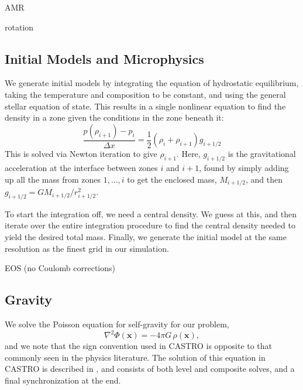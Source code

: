 \documentclass[12pt,preprint]{aastex}
\begin{document}
AMR

rotation


\subsection{Initial Models and Microphysics}


We generate initial models by integrating the equation of hydrostatic
equilibrium, taking the temperature and composition to be constant,
and using the general stellar equation of state.  This results in
a single nonlinear equation to find the density in a zone given the
conditions in the zone beneath it:
\begin{equation}
\frac{p(\rho_{i+1}) - p_i}{\Delta x} = \frac{1}{2} (\rho_i + \rho_{i+1}) g_{i+1/2}
\end{equation}
This is solved via Newton iteration to give $\rho_{i+1}$.  Here, $g_{i+1/2}$
is the gravitational acceleration at the interface between zones $i$ and $i+1$,
found by simply adding up all the mass from zones $1, \ldots, i$ to get the
enclosed mass, $M_{i+1/2}$, and then $g_{i+1/2} = GM_{i+1/2}/r_{i+1/2}^2$.

To start the integration off, we need a central density.  We guess at
this, and then iterate over the entire integration procedure to find
the central density needed to yield the desired total mass.  Finally,
we generate the initial model at the same resolution as the finest
grid in our simulation.

EOS (no Coulomb corrections)


\subsection{Gravity}

We solve the Poisson equation for self-gravity for our problem,
\begin{equation}
  \nabla^2 \Phi(\mathbf{x}) = -4\pi G\, \rho(\mathbf{x}),
\end{equation}
and we note that the sign convention used in CASTRO is opposite to that commonly seen in the physics literature. The solution of this equation in CASTRO is described in \cite{castro}, and consists of both level and composite solves, and a final synchronization at the end.
\end{document}
